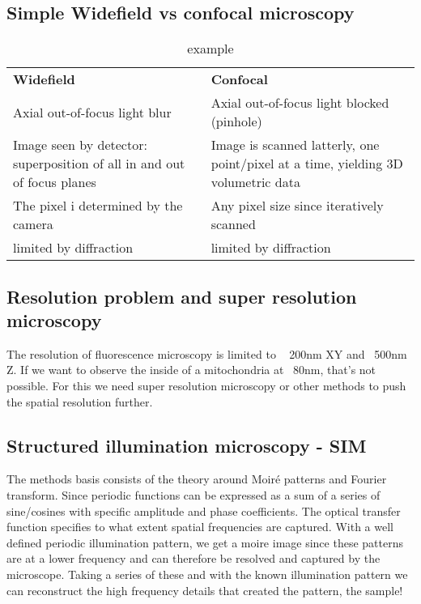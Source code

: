 	\subsection{Simple Widefield vs confocal microscopy}
	
	\begin{table}[ht!]
	\centering
	\begin{tabularx}{\textwidth}{XX}\hline
	 \textbf{Widefield}&  \textbf{Confocal}  \\
	 Axial out-of-focus light blur&   Axial out-of-focus light blocked (pinhole) \\
	 Image seen by detector: superposition of all in and out of focus planes& Image is scanned latterly, one point/pixel at a time, yielding 3D volumetric data   \\

	 The pixel i determined by the camera & Any pixel size since iteratively scanned  \\ 
	 limited by diffraction& limited by diffraction\\ \hline
	\end{tabularx}
	\caption{example}
	\label{tab:tab1}
	\end{table}
	
	\subsection{Resolution problem and super resolution microscopy}
	The resolution of fluorescence microscopy is limited to ~ 200nm XY and ~500nm Z. If we want to observe the inside of a mitochondria at ~80nm, that's not possible. For this we need super resolution microscopy or other methods to push the spatial resolution further. 

	\subsection{Structured illumination microscopy - SIM}
	The methods basis consists of the theory around Moiré patterns and Fourier transform. Since periodic functions can be expressed as a sum of a series of sine/cosines with specific amplitude and phase coefficients. The optical transfer function specifies to what extent spatial frequencies are captured. 
	With a well defined periodic illumination pattern, we get a moire image since these patterns are at a lower frequency and can therefore be resolved and captured by the microscope. Taking a series of these and with the known illumination pattern we can reconstruct the high frequency details that created the pattern, the sample!

